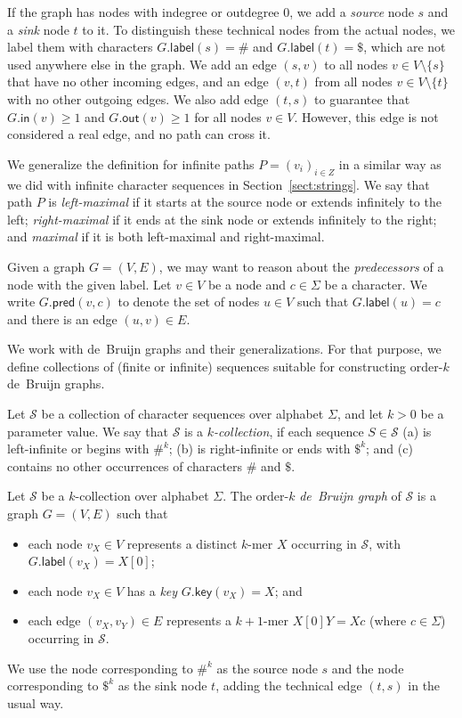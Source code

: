 \documentclass[a4paper,UKenglish]{lipics-v2016}
\newcommand{\set}[1]{\ensuremath{\{ #1 \}}}
\newcommand{\gindegree}{\ensuremath{\mathsf{in}}}
\newcommand{\goutdegree}{\ensuremath{\mathsf{out}}}
\newcommand{\glabel}{\ensuremath{\mathsf{label}}}
\newcommand{\gpred}{\ensuremath{\mathsf{pred}}}
\newcommand{\gkey}{\ensuremath{\mathsf{key}}}
\newcommand{\kmer}[1]{$#1$\nobreakdash-mer}
\newcommand{\kcollection}[1]{$#1$\nobreakdash-collection}
\newcommand{\orderk}[1]{order\nobreakdash-$#1$}
\begin{document}
If the graph has nodes with indegree or outdegree $0$, we add a \emph{source} node $s$ and a \emph{sink} node $t$ to it. To distinguish these technical nodes from the actual nodes, we label them with characters $G.\glabel(s) = \#$ and $G.\glabel(t) = \$$, which are not used anywhere else in the graph. We add an edge $(s, v)$ to all nodes $v \in V \setminus \set{s}$ that have no other incoming edges, and an edge $(v, t)$ from all nodes $v \in V \setminus \set{t}$ with no other outgoing edges. We also add edge $(t, s)$ to guarantee that $G.\gindegree(v) \ge 1$ and $G.\goutdegree(v) \ge 1$ for all nodes $v \in V$. However, this edge is not considered a real edge, and no path can cross it.

We generalize the definition for infinite paths $P = (v_{i})_{i \in Z}$ in a similar way as we did with infinite character sequences in Section~\ref{sect:strings}. We say that path $P$ is \emph{left-maximal} if it starts at the source node or extends infinitely to the left; \emph{right-maximal} if it ends at the sink node or extends infinitely to the right; and \emph{maximal} if it is both left-maximal and right-maximal.

Given a graph $G = (V, E)$, we may want to reason about the \emph{predecessors} of a node with the given label. Let $v \in V$ be a node and $c \in \Sigma$ be a character. We write $G.\gpred(v, c)$ to denote the set of nodes $u \in V$ such that $G.\glabel(u) = c$ and there is an edge $(u, v) \in E$.

We work with de~Bruijn graphs and their generalizations. For that purpose, we define collections of (finite or infinite) sequences suitable for constructing \orderk{k} de~Bruijn graphs.

\begin{definition}[\kcollection{k}]
Let $\mathcal{S}$ be a collection of character sequences over alphabet $\Sigma$, and let $k > 0$ be a parameter value. We say that $\mathcal{S}$ is a \emph{\kcollection{k}}, if each sequence $S \in \mathcal{S}$
(a) is left-infinite or begins with $\#^{k}$;
(b) is right-infinite or ends with $\$^{k}$; and
(c) contains no other occurrences of characters $\#$ and $\$$.
\end{definition}

\begin{definition}
Let $\mathcal{S}$ be a \kcollection{k} over alphabet $\Sigma$. The \orderk{k} \emph{de~Bruijn graph} of $\mathcal{S}$ is a graph $G = (V, E)$ such that
\begin{itemize}
\item each node $v_{X} \in V$ represents a distinct \kmer{k} $X$ occurring in $\mathcal{S}$, with $G.\glabel(v_{X}) = X[0]$;
\item each node $v_{X} \in V$ has a \emph{key} $G.\gkey(v_{X}) = X$; and
\item each edge $(v_{X}, v_{Y}) \in E$ represents a \kmer{k+1} $X[0]Y = Xc$ (where $c \in \Sigma$) occurring in $\mathcal{S}$.
\end{itemize}
We use the node corresponding to $\#^{k}$ as the source node $s$ and the node corresponding to $\$^{k}$ as the sink node $t$, adding the technical edge $(t, s)$ in the usual way.
\end{definition}
\end{document}
